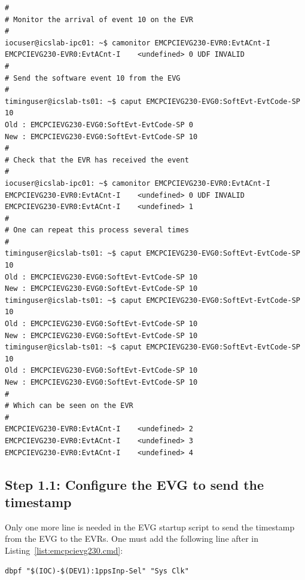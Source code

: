 \documentclass[11pt
  , a4paper
  , article
  , oneside
  , showtrims
]{memoir}
\begin{document}
\begin{lstlisting}[style=termstyle]
#
# Monitor the arrival of event 10 on the EVR
#
iocuser@icslab-ipc01: ~$ camonitor EMCPCIEVG230-EVR0:EvtACnt-I
EMCPCIEVG230-EVR0:EvtACnt-I    <undefined> 0 UDF INVALID
#
# Send the software event 10 from the EVG
#
timinguser@icslab-ts01: ~$ caput EMCPCIEVG230-EVG0:SoftEvt-EvtCode-SP 10
Old : EMCPCIEVG230-EVG0:SoftEvt-EvtCode-SP 0
New : EMCPCIEVG230-EVG0:SoftEvt-EvtCode-SP 10
#
# Check that the EVR has received the event
#
iocuser@icslab-ipc01: ~$ camonitor EMCPCIEVG230-EVR0:EvtACnt-I
EMCPCIEVG230-EVR0:EvtACnt-I    <undefined> 0 UDF INVALID
EMCPCIEVG230-EVR0:EvtACnt-I    <undefined> 1
#
# One can repeat this process several times
#
timinguser@icslab-ts01: ~$ caput EMCPCIEVG230-EVG0:SoftEvt-EvtCode-SP 10
Old : EMCPCIEVG230-EVG0:SoftEvt-EvtCode-SP 10
New : EMCPCIEVG230-EVG0:SoftEvt-EvtCode-SP 10
timinguser@icslab-ts01: ~$ caput EMCPCIEVG230-EVG0:SoftEvt-EvtCode-SP 10
Old : EMCPCIEVG230-EVG0:SoftEvt-EvtCode-SP 10
New : EMCPCIEVG230-EVG0:SoftEvt-EvtCode-SP 10
timinguser@icslab-ts01: ~$ caput EMCPCIEVG230-EVG0:SoftEvt-EvtCode-SP 10
Old : EMCPCIEVG230-EVG0:SoftEvt-EvtCode-SP 10
New : EMCPCIEVG230-EVG0:SoftEvt-EvtCode-SP 10
#
# Which can be seen on the EVR
#
EMCPCIEVG230-EVR0:EvtACnt-I    <undefined> 2
EMCPCIEVG230-EVR0:EvtACnt-I    <undefined> 3
EMCPCIEVG230-EVR0:EvtACnt-I    <undefined> 4
\end{lstlisting}

\subsection{Step 1.1: Configure the EVG to send the timestamp}
Only one more line is needed in the EVG startup script to send the timestamp from the EVG to the EVRs. One must add the following line after  in Listing~\ref{list:emcpcievg230.cmd}:
\begin{lstlisting}[style=termstyle]
dbpf "$(IOC)-$(DEV1):1ppsInp-Sel" "Sys Clk"
\end{lstlisting}
\end{document}
